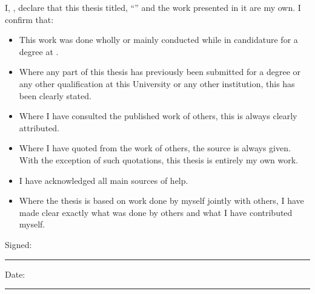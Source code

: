 
\begin{declaration}
\addchaptertocentry{\authorshipname}

\noindent I, \authorname, declare that this thesis titled, \enquote{\ttitle} and the work presented in it are my own. I confirm that:

\begin{itemize} 
\item This work was done wholly or mainly conducted while in candidature for a degree at \universityname{}.
\item Where any part of this thesis has previously been submitted for a degree or any other qualification at this University or any other institution, this has been clearly stated.
\item Where I have consulted the published work of others, this is always clearly attributed.
\item Where I have quoted from the work of others, the source is always given. With the exception of such quotations, this thesis is entirely my own work.
\item I have acknowledged all main sources of help.
\item Where the thesis is based on work done by myself jointly with others, I have made clear exactly what was done by others and what I have contributed myself.\\
\end{itemize}
 
\noindent Signed:\\
\rule[0.5em]{25em}{0.5pt} %
 
\noindent Date:\\
\rule[0.5em]{25em}{0.5pt} %
\end{declaration}

\cleardoublepage



\begin{abstract}
\addchaptertocentry{\abstractname} %

\end{abstract}

